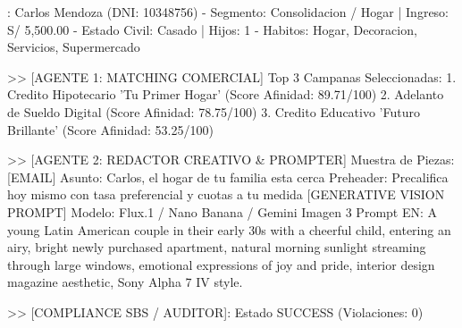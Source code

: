 \begin{azureterminal}: Carlos Mendoza (DNI: 10348756)
  - Segmento: Consolidacion / Hogar | Ingreso: S/ 5,500.00
  - Estado Civil: Casado | Hijos: 1
  - Habitos: Hogar, Decoracion, Servicios, Supermercado

  >> [AGENTE 1: MATCHING COMERCIAL] Top 3 Campanas Seleccionadas:
     1. Credito Hipotecario 'Tu Primer Hogar' (Score Afinidad: 89.71/100)
     2. Adelanto de Sueldo Digital (Score Afinidad: 78.75/100)
     3. Credito Educativo 'Futuro Brillante' (Score Afinidad: 53.25/100)

  >> [AGENTE 2: REDACTOR CREATIVO & PROMPTER] Muestra de Piezas:
     [EMAIL]
       Asunto:    Carlos, el hogar de tu familia esta cerca
       Preheader: Precalifica hoy mismo con tasa preferencial y cuotas a tu medida
     [GENERATIVE VISION PROMPT]
       Modelo:    Flux.1 / Nano Banana / Gemini Imagen 3
       Prompt EN: A young Latin American couple in their early 30s with a cheerful child, entering an airy, bright newly purchased apartment, natural morning sunlight streaming through large windows, emotional expressions of joy and pride, interior design magazine aesthetic, Sony Alpha 7 IV style.

  >> [COMPLIANCE SBS / AUDITOR]: Estado SUCCESS (Violaciones: 0)
\end{azureterminal}
